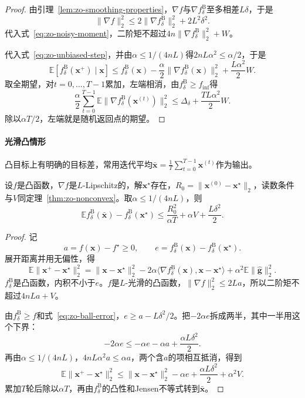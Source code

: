\begin{proof}
由引理~\ref{lem:zo-smoothing-properties}，$\nabla f$与$\nabla f^{\mathrm{B}}_{\delta}$至多相差$L\delta$，于是
\[
 \lVert\nabla f\rVert_2^2\leq2\lVert\nabla f^{\mathrm{B}}_{\delta}\rVert_2^2+2L^2\delta^2.
\]
代入式~\eqref{eq:zo-noisy-moment}，二阶矩不超过$4n\lVert\nabla f^{\mathrm{B}}_{\delta}\rVert_2^2+W$。

代入式~\eqref{eq:zo-unbiased-step}，并由$\alpha\leq1/(4nL)$得$2nL\alpha^2\leq\alpha/2$，于是
\[
 \mathbb{E}[f^{\mathrm{B}}_{\delta}(\bm{x}^{+})\mid\bm{x}]\leq f^{\mathrm{B}}_{\delta}(\bm{x})-\frac{\alpha}{2}\lVert\nabla f^{\mathrm{B}}_{\delta}(\bm{x})\rVert_2^2+\frac{L\alpha^2}{2}W.
\]
取全期望，对$t=0,\ldots,T-1$累加，左端相消，由$f^{\mathrm{B}}_{\delta}\geq f_{\inf}$得
\[
 \frac{\alpha}{2}\sum_{t=0}^{T-1}\mathbb{E}\lVert\nabla f^{\mathrm{B}}_{\delta}(\bm{x}^{(t)})\rVert_2^2\leq\Delta_\delta+\frac{TL\alpha^2}{2}W.
\]
除以$\alpha T/2$，左端就是随机返回点的期望。
\end{proof}

\paragraph{光滑凸情形}
凸目标上有明确的目标差，常用迭代平均$\bar{\bm{x}}=\tfrac1T\sum_{t=0}^{T-1}\bm{x}^{(t)}$作为输出。

\begin{theorem}[光滑凸目标]
\label{thm:zo-convex}
设$f$是凸函数，$\nabla f$是$L$-Lipschitz的，解$\bm{x}^\star$存在，$R_0=\lVert\bm{x}^{(0)}-\bm{x}^\star\rVert_2$，读数条件与$V$同定理~\ref{thm:zo-nonconvex}。取$\alpha\leq1/(4nL)$，则
\begin{equation}
 \mathbb{E}f^{\mathrm{B}}_{\delta}(\bar{\bm{x}})-f^{\mathrm{B}}_{\delta}(\bm{x}^\star)\leq\frac{R_0^2}{\alpha T}+\alpha V+\frac{L\delta^2}{2}.
 \label{eq:zo-convex-rate}
\end{equation}
\end{theorem}

\begin{proof}
记
\[
 a=f(\bm{x})-f^\star\geq0,\qquad e=f^{\mathrm{B}}_{\delta}(\bm{x})-f^{\mathrm{B}}_{\delta}(\bm{x}^\star).
\]
展开距离并用无偏性，得
\[
 \mathbb{E}\lVert\bm{x}^+-\bm{x}^\star\rVert_2^2=\lVert\bm{x}-\bm{x}^\star\rVert_2^2-2\alpha\langle\nabla f^{\mathrm{B}}_{\delta}(\bm{x}),\bm{x}-\bm{x}^\star\rangle+\alpha^2\mathbb{E}\lVert\hat{\bm{g}}\rVert_2^2.
\]
$f^{\mathrm{B}}_{\delta}$是凸函数，内积不小于$e$。$f$是$L$-光滑的凸函数，$\lVert\nabla f\rVert_2^2\leq2La$，所以二阶矩不超过$4nLa+V$。

由$f^{\mathrm{B}}_{\delta}\geq f$和式~\eqref{eq:zo-ball-error}，$e\geq a-L\delta^2/2$。把$-2\alpha e$拆成两半，其中一半用这个下界：
\[
 -2\alpha e\leq-\alpha e-\alpha a+\frac{\alpha L\delta^2}{2}.
\]
再由$\alpha\leq1/(4nL)$，$4nL\alpha^2a\leq\alpha a$，两个含$a$的项相互抵消，得到
\[
 \mathbb{E}\lVert\bm{x}^+-\bm{x}^\star\rVert_2^2\leq\lVert\bm{x}-\bm{x}^\star\rVert_2^2-\alpha e+\frac{\alpha L\delta^2}{2}+\alpha^2V.
\]
累加$T$轮后除以$\alpha T$，再由$f^{\mathrm{B}}_{\delta}$的凸性和Jensen不等式转到$\bar{\bm{x}}$。
\end{proof}

